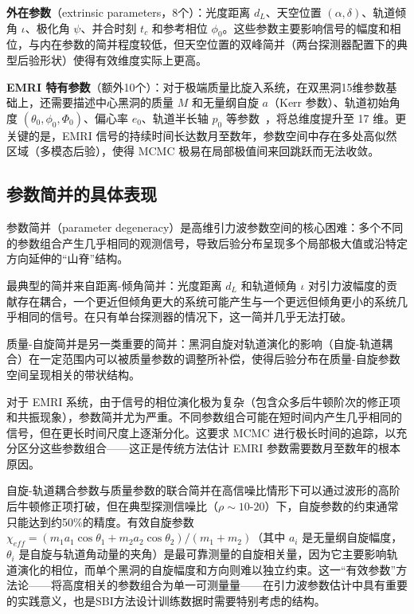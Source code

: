 \textbf{外在参数}（extrinsic parameters，8个）：光度距离 $d_L$、天空位置 $(\alpha, \delta)$、轨道倾角 $\iota$、极化角 $\psi$、并合时刻 $t_c$ 和参考相位 $\phi_0$。这些参数主要影响信号的幅度和相位，与内在参数的简并程度较低，但天空位置的双峰简并（两台探测器配置下的典型后验形状）使得有效维度实际上更高。

\textbf{EMRI 特有参数}（额外10个）：对于极端质量比旋入系统，在双黑洞15维参数基础上，还需要描述中心黑洞的质量 $M$ 和无量纲自旋 $a$（Kerr 参数）、轨道初始角度 $(\theta_0, \phi_0, \Phi_0)$、偏心率 $e_0$、轨道半长轴 $p_0$ 等参数~\cite{liang2024cnfemri}，将总维度提升至 17 维。更关键的是，EMRI 信号的持续时间长达数月至数年，参数空间中存在多处高似然区域（多模态后验），使得 MCMC 极易在局部极值间来回跳跃而无法收敛。

\subsection{参数简并的具体表现}

参数简并（parameter degeneracy）是高维引力波参数空间的核心困难：多个不同的参数组合产生几乎相同的观测信号，导致后验分布呈现多个局部极大值或沿特定方向延伸的“山脊”结构。

最典型的简并来自距离-倾角简并：光度距离 $d_L$ 和轨道倾角 $\iota$ 对引力波幅度的贡献存在耦合，一个更近但倾角更大的系统可能产生与一个更远但倾角更小的系统几乎相同的信号。在只有单台探测器的情况下，这一简并几乎无法打破。

质量-自旋简并是另一类重要的简并：黑洞自旋对轨道演化的影响（自旋-轨道耦合）在一定范围内可以被质量参数的调整所补偿，使得后验分布在质量-自旋参数空间呈现相关的带状结构。

对于 EMRI 系统，由于信号的相位演化极为复杂（包含众多后牛顿阶次的修正项和共振现象），参数简并尤为严重。不同参数组合可能在短时间内产生几乎相同的信号，但在更长时间尺度上逐渐分化。这要求 MCMC 进行极长时间的追踪，以充分区分这些参数组合——这正是传统方法估计 EMRI 参数需要数月至数年的根本原因。

自旋-轨道耦合参数与质量参数的联合简并在高信噪比情形下可以通过波形的高阶后牛顿修正项打破，但在典型探测信噪比（$\rho \sim 10$-$20$）下，自旋参数的约束通常只能达到约50\%的精度。有效自旋参数 $\chi_{eff} = (m_1 a_1\cos\theta_1 + m_2 a_2\cos\theta_2)/(m_1+m_2)$（其中 $a_i$ 是无量纲自旋幅度，$\theta_i$ 是自旋与轨道角动量的夹角）是最可靠测量的自旋相关量，因为它主要影响轨道演化的相位，而单个黑洞的自旋幅度和方向则难以独立约束。这一“有效参数”方法论——将高度相关的参数组合为单一可测量量——在引力波参数估计中具有重要的实践意义，也是SBI方法设计训练数据时需要特别考虑的结构。

